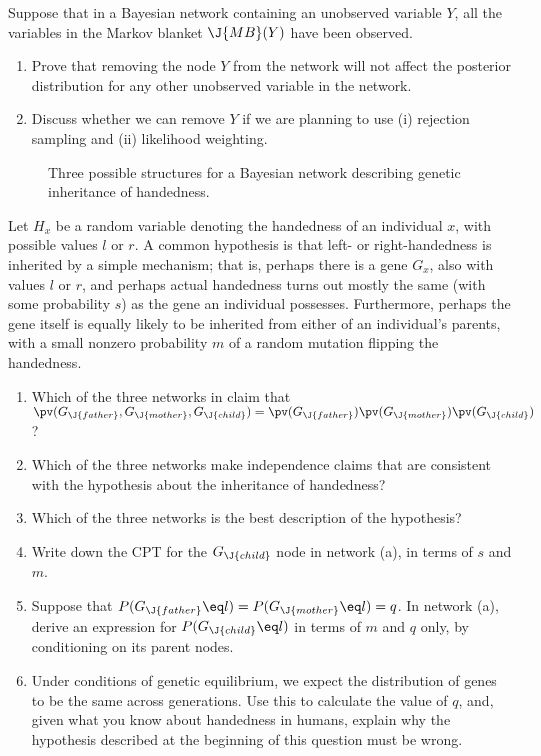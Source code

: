 \begin{uexercise}
Suppose that in a Bayesian network containing an unobserved variable \(Y\), all the 
variables in the Markov blanket \(\J{MB}(Y)\) have been observed.
\begin{enumerate}
\item Prove that removing the node \(Y\) from the network will not affect the 
posterior distribution for any other unobserved variable in the network.
\item Discuss whether we can remove \(Y\) if we are planning to use (i) rejection sampling and (ii) likelihood weighting.
\end{enumerate}
\end{uexercise} 

\begin{figure}[h]
\caption{Three possible structures for a Bayesian network describing genetic inheritance of handedness.}
\label{handedness-figure}
\end{figure} 

\begin{exercise}
Let \(H_x\) be a random variable denoting the handedness of an individual \(x\), with possible values \(l\) or \(r\).
A common hypothesis is that left- or right-handedness is inherited by a simple mechanism; that is, perhaps there is
a gene \(G_x\), also with values \(l\) or \(r\), and perhaps actual handedness
turns out mostly the same (with some probability \(s\)) as the gene an individual possesses.
Furthermore, perhaps the gene itself is equally likely
to be inherited from either of an individual's parents, with a small nonzero probability \(m\)
of a random mutation flipping the handedness.  
\begin{enumerate}
\item Which of the three networks in  claim that 
\( \pv(G_{\J{father}},G_{\J{mother}},G_{\J{child}}) = \pv(G_{\J{father}})\pv(G_{\J{mother}})\pv(G_{\J{child}})\)?
\item Which of the three networks make independence claims that are consistent with the hypothesis about the inheritance of handedness?
\item Which of the three networks is the best description of the hypothesis?
\item Write down the CPT for the \(G_{\J{child}}\) node in network (a), in terms of \(s\) and \(m\).
\item Suppose that \(P(G_{\J{father}}\eq l)=P(G_{\J{mother}}\eq l)=q\). In network (a), derive an expression
for \(P(G_{\J{child}}\eq l)\) in terms of \(m\) and \(q\) only, by conditioning on its parent nodes.
\item Under conditions of genetic equilibrium, we expect the
distribution of genes to be the same across generations.
Use this to calculate the value of \(q\), and, given what you
know about handedness in humans, explain why the hypothesis described
at the beginning of this question must be wrong.
\end{enumerate}
\end{exercise} 

